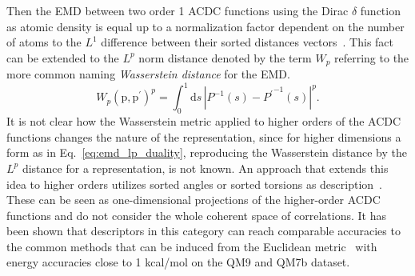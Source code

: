 Then the EMD between two order 1 ACDC functions using the Dirac $\delta$ function as atomic density is equal up to a normalization factor dependent on the number of atoms to the $L^1$ difference between their sorted distances vectors~\cite{will+19jcp}.
This fact can be extended to the $L^p$ norm distance denoted by the term $W_p$ referring to the more common naming \emph{Wasserstein distance} for the EMD.
\begin{equation}
  \label{eq:emd_lp_duality}
  W_p(\textrm{p}, \textrm{p}^\prime)^p=\int_0^1\mathrm{d}{s}\,\left|P^{-1}(s) -{P^{\prime}}^{-1}(s)\right|^p.
\end{equation}
It is not clear how the Wasserstein metric applied to higher orders of the ACDC functions changes the nature of the representation, since for higher dimensions a form as in Eq.~\eqref{eq:emd_lp_duality}, reproducing the Wasserstein distance by the $L^p$ distance for a representation, is not known.
An approach that extends this idea to higher orders utilizes sorted angles or sorted torsions as description~\cite{huang2016communication}.
These can be seen as one-dimensional projections of the higher-order ACDC functions and do not consider the whole coherent space of correlations.
It has been shown that descriptors in this category can reach comparable accuracies to the common methods that can be induced from the Euclidean metric~\cite{barker2016localized,huang2016communication} with energy accuracies close to 1 kcal/mol on the QM9 and QM7b dataset. %
